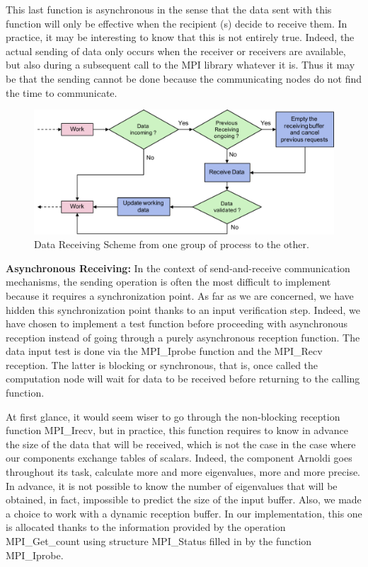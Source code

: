 This last function is asynchronous in the sense that the data sent with this function will only be effective when the recipient (s) decide to receive them. In practice, it may be interesting to know that this is not entirely true. Indeed, the actual sending of data only occurs when the receiver or receivers are available, but also during a subsequent call to the MPI library whatever it is. Thus it may be that the sending cannot be done because the communicating nodes do not find the time to communicate. 

\begin{figure}
	\centering
	\includegraphics[width=6.2in]{fig/recv.pdf}
	\caption{Data Receiving Scheme from one group of process to the other.}
	\label{fig:recv}
\end{figure}

\textbf{Asynchronous Receiving:} In the context of send-and-receive communication mechanisms, the sending operation is often the most difficult to implement because it requires a synchronization point. As far as we are concerned, we have hidden this synchronization point thanks to an input verification step. Indeed, we have chosen to implement a test function before proceeding with asynchronous reception instead of going through a purely asynchronous reception function. The data input test is done via the MPI\_Iprobe function and the MPI\_Recv reception. The latter is blocking or synchronous, that is, once called the computation node will wait for data to be received before returning to the calling function. 

At first glance, it would seem wiser to go through the non-blocking reception function MPI\_Irecv, but in practice, this function requires to know in advance the size of the data that will be received, which is not the case in the case where our components exchange tables of scalars. Indeed, the component Arnoldi goes throughout its task, calculate more and more eigenvalues, more and more precise. In advance, it is not possible to know the number of eigenvalues that will be obtained, in fact, impossible to predict the size of the input buffer. Also, we made a choice to work with a dynamic reception buffer. In our implementation, this one is allocated thanks to the information provided by the operation MPI\_Get\_count using structure MPI\_Status filled in by the function MPI\_Iprobe.

